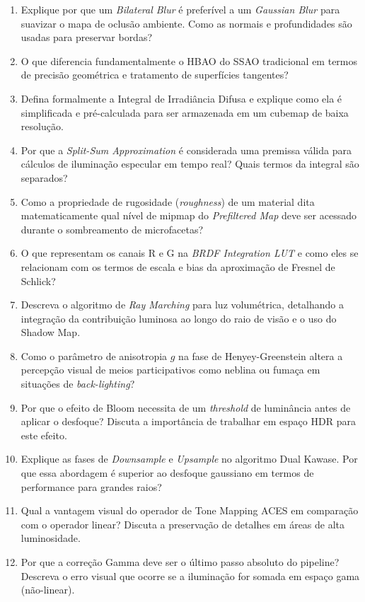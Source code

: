 \begin{enumerate}
    \item Explique por que um \textit{Bilateral Blur} é preferível a um \textit{Gaussian Blur} para suavizar o mapa de oclusão ambiente. Como as normais e profundidades são usadas para preservar bordas?
    \item O que diferencia fundamentalmente o HBAO do SSAO tradicional em termos de precisão geométrica e tratamento de superfícies tangentes?
    \item Defina formalmente a Integral de Irradiância Difusa e explique como ela é simplificada e pré-calculada para ser armazenada em um cubemap de baixa resolução.
    \item Por que a \textit{Split-Sum Approximation} é considerada uma premissa válida para cálculos de iluminação especular em tempo real? Quais termos da integral são separados?
    \item Como a propriedade de rugosidade (\textit{roughness}) de um material dita matematicamente qual nível de mipmap do \textit{Prefiltered Map} deve ser acessado durante o sombreamento de microfacetas?
    \item O que representam os canais R e G na \textit{BRDF Integration LUT} e como eles se relacionam com os termos de escala e bias da aproximação de Fresnel de Schlick?
    \item Descreva o algoritmo de \textit{Ray Marching} para luz volumétrica, detalhando a integração da contribuição luminosa ao longo do raio de visão e o uso do Shadow Map.
    \item Como o parâmetro de anisotropia $g$ na fase de Henyey-Greenstein altera a percepção visual de meios participativos como neblina ou fumaça em situações de \textit{back-lighting}?
    \item Por que o efeito de Bloom necessita de um \textit{threshold} de luminância antes de aplicar o desfoque? Discuta a importância de trabalhar em espaço HDR para este efeito.
    \item Explique as fases de \textit{Downsample} e \textit{Upsample} no algoritmo Dual Kawase. Por que essa abordagem é superior ao desfoque gaussiano em termos de performance para grandes raios?
    \item Qual a vantagem visual do operador de Tone Mapping ACES em comparação com o operador linear? Discuta a preservação de detalhes em áreas de alta luminosidade.
    \item Por que a correção Gamma deve ser o último passo absoluto do pipeline? Descreva o erro visual que ocorre se a iluminação for somada em espaço gama (não-linear).

\end{enumerate}
